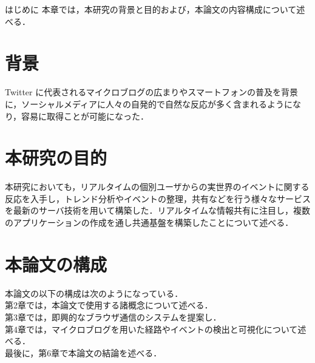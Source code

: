 \chapterhead
{はじめに}
{本章では，本研究の背景と目的および，本論文の内容構成について述べる．}

\section{背景}
Twitter に代表されるマイクロブログの広まりやスマートフォンの普及を背景に，ソーシャルメディアに人々の自発的で自然な反応が多く含まれるようになり，容易に取得ことが可能になった．


\section{本研究の目的}
本研究においても，リアルタイムの個別ユーザからの実世界のイベントに関する反応を入手し，トレンド分析やイベントの整理，共有などを行う様々なサービスを最新のサーバ技術を用いて構築した．リアルタイムな情報共有に注目し，複数のアプリケーションの作成を通し共通基盤を構築したことについて述べる．


\section{本論文の構成}
本論文の以下の構成は次のようになっている．\\
第2章では，本論文で使用する諸概念について述べる．\\
第3章では，即興的なブラウザ通信のシステムを提案し．\\
第4章では，マイクロブログを用いた経路やイベントの検出と可視化について述べる．\\
最後に，第6章で本論文の結論を述べる．\\
